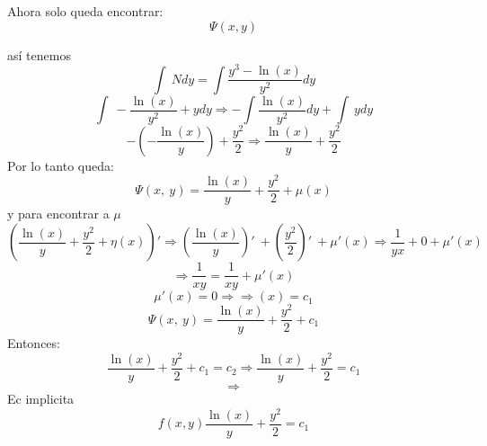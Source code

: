 Ahora solo queda encontrar: $$\Psi(x,y)$$

así tenemos $$\int \:Ndy=\int \frac{y^3-\ln \left(x\right)}{y^2}dy$$
$$\int \:-\frac{\ln \left(x\right)}{y^2}+ydy\Rightarrow -\int \frac{\ln \left(x\right)}{y^2}dy+\int \:ydy$$
$$-\left(-\frac{\ln \left(x\right)}{y}\right)+\frac{y^2}{2}\Rightarrow \frac{\ln \left(x\right)}{y}+\frac{y^2}{2}$$
Por lo tanto queda:
$$\Psi\left(x,\:y\right)=\frac{\ln \left(x\right)}{y}+\frac{y^2}{2}+\mu\left(x\right)$$
y para encontrar a $\mu$
$$\left(\frac{\ln \left(x\right)}{y}+\frac{y^2}{2}+η\left(x\right)\right)'\Rightarrow \left(\frac{\ln \left(x\right)}{y}\right)'\:+\left(\frac{y^2}{2}\right)'\:+\mu'\left(x\right)\Rightarrow \frac{1}{yx}+0+\mu'\left(x\right)$$
$$\Rightarrow \frac{1}{xy}=\frac{1}{xy}+\mu'\left(x\right)$$
$$\mu'\left(x\right)=0 \Rightarrow \Rightarrow\left(x\right)=c_1$$
$$\Psi \left(x,\:y\right)=\frac{\ln \left(x\right)}{y}+\frac{y^2}{2}+c_1$$
Entonces:
$$\frac{\ln \left(x\right)}{y}+\frac{y^2}{2}+c_1=c_2\Rightarrow \frac{\ln \left(x\right)}{y}+\frac{y^2}{2}=c_1$$
$$\Rightarrow$$
Ec implicita
$$f(x,y)\frac{\ln \left(x\right)}{y}+\frac{y^2}{2}=c_1$$